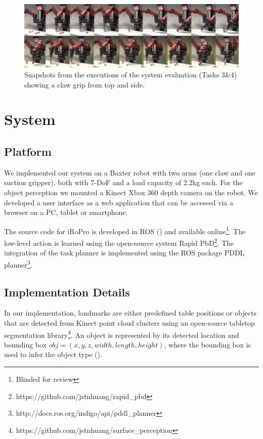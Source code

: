 \begin{figure}[t]
\centering
 \includegraphics[width=\linewidth]{figures/filmstrip.png}
\caption{Snapshots from the executions of the system evaluation (Tasks 3\&4) showing a claw grip from top and side.}
\label{fig:filmstrip}
\end{figure}
\section{System}
\label{sec:system}
\subsection{Platform}
\label{sec:platform}
We implemented our system on a Baxter robot with two arms (one claw and one suction gripper), both with 7-DoF and a load capacity of 2.2kg each.
For the object perception we mounted a Kinect Xbox 360 depth camera on the robot.
We developed a user interface as a web application that can be accessed via a browser on a PC, tablet or smartphone.

The source code for iRoPro is developed in ROS (\cite{quigley2009ros}) and available online\footnote{Blinded for review}. %
The low-level action is learned using the open-source system Rapid PbD\footnote{https://github.com/jstnhuang/rapid\_pbd}.
The integration of the task planner is implemented using the ROS package PDDL planner\footnote{http://docs.ros.org/indigo/api/pddl\_planner}.

\subsection{Implementation Details}
\label{sec:implementation}
In our implementation, landmarks are either predefined table positions or 
objects that are detected from Kinect point cloud clusters using an open-source tabletop segmentation library\footnote{https://github.com/jstnhuang/surface\_perception}.
An object is represented by its detected location and bounding box $obj = (x,y,z, width, length, height)$, where the bounding box is used to infer the object type ().

